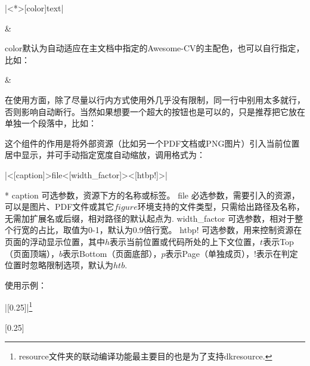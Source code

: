 |\dkbutton<*>[color]{text}|

\begin{center}
   \& 
\end{center}

color默认为自动适应在主文档中指定的Awesome-CV的主配色，也可以自行指定，比如：

\begin{center}
   \& 
\end{center}

在使用方面，除了尽量以行内方式使用外几乎没有限制，同一行中别用太多就行，否则影响自动断行。当然如果想要一个超大的按钮也是可以的，只是推荐把它放在单独一个段落中，比如：

\begin{center}
  \vspace{1em}
  \vspace{1em}
\end{center}

这个组件的作用是将外部资源（比如另一个PDF文档或PNG图片）引入当前位置居中显示，并可手动指定宽度自动缩放，调用格式为：

|\dkresource<[caption]>{file}<[width_factor]><[htbp!]>|

\begin{cvskills}*
  \cvskill
  {caption}
  {可选参数，资源下方的名称或标签。}
  \cvskill
  {file}
  {必选参数，需要引入的资源，可以是图片、PDF文件或其它$figure$环境支持的文件类型，只需给出路径及名称，无需加扩展名或后缀，相对路径的默认起点为.}
  \cvskill
  {width\_factor}
  {可选参数，相对于整个行宽的占比，取值为0-1，默认为0.9倍行宽。}
  \cvskill
  {htbp!}
  {可选参数，用来控制资源在页面的浮动显示位置，其中$h$表示当前位置或代码所处的上下文位置，$t$表示Top（页面顶端），$b$表示Bottom（页面底部），$p$表示Page（单独成页），$!$表示在判定位置时忽略限制选项，默认为$htb$.}
\end{cvskills}

使用示例：

|[0.25]|\footnote{resource文件夹的联动编译功能最主要目的也是为了支持dkresource.}

[0.25]

